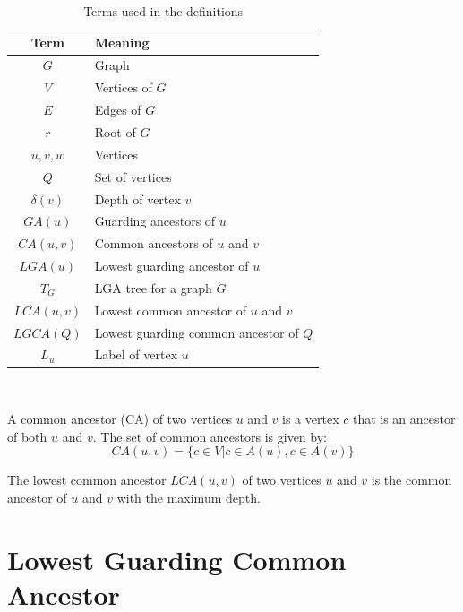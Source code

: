 \begin{table}[ht]
    \centering
	\captionsetup{justification=centering}
	\begin{tabular}{c l}
		\textbf{Term} & \textbf{Meaning} \\
		\hline 
		$G$ & Graph \\
		$V$ & Vertices of $G$\\
		$E$ & Edges of $G$\\
		$r$ & Root of $G$\\
		$u, v, w$& Vertices \\
		$Q$ & Set of vertices\\
		$\delta(v)$ & Depth of vertex $v$\\
		$GA(u)$ & Guarding ancestors of $u$\\
		$CA(u,v)$ & Common ancestors of $u$ and $v$\\
		$LGA(u)$ & Lowest guarding ancestor of $u$\\
		$T_G$ & LGA tree for a graph $G$\\
		$LCA(u,v)$ & Lowest common ancestor of $u$ and $v$\\
		$LGCA(Q)$ & Lowest guarding common ancestor of $Q$\\
		$L_u$ & Label of vertex $u$\\
	\end{tabular}\\
	\caption{Terms used in the definitions}
	\label{definitionsLegend}
\end{table}

\begin{definition} \label{def:commonAncestor}
	A common ancestor (CA) of two vertices $u$ and $v$ is a vertex $c$ that is an ancestor of both $u$ and $v$.
	The set of common ancestors is given by:
	\begin{equation*}
		\mathit{CA}(u,v) =	\{c \in V | c \in A(u) , c \in A(v)\}
	\end{equation*}
\end{definition}

\begin{definition} \label{def:LowestCommonAncestor}
	The lowest common ancestor $LCA(u,v)$ of two vertices $u$ and $v$ is the common ancestor of $u$ and $v$ with the maximum depth.
\end{definition}


\section{Lowest Guarding Common Ancestor} \label{LGCADefinitions}

